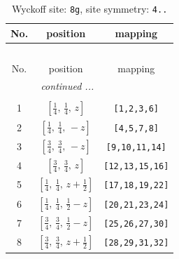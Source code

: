 \documentclass[fleqn,8pt]{jsarticle}
\begin{document}
\begin{longtable}{ccc}
\caption{Wyckoff site: {\tt 8g}, site symmetry: {\tt 4..}}
 \\
 \hline \hline
No. & position & mapping \\ \hline \endfirsthead

\multicolumn{2}{l}{\tablename\ \thetable{}} \\
 \hline \hline
No. & position & mapping \\ \hline \endhead

 \hline \hline
\multicolumn{2}{r}{\footnotesize\it continued ...} \\ \endfoot

 \hline \hline
\multicolumn{2}{r}{} \\ \endlastfoot

1 & $\left[ \frac{1}{4},\, \frac{1}{4},\, z \right]$ & {\tt [1,2,3,6]} \\ \hline
2 & $\left[ \frac{1}{4},\, \frac{1}{4},\, - z \right]$ & {\tt [4,5,7,8]} \\ \hline
3 & $\left[ \frac{3}{4},\, \frac{3}{4},\, - z \right]$ & {\tt [9,10,11,14]} \\ \hline
4 & $\left[ \frac{3}{4},\, \frac{3}{4},\, z \right]$ & {\tt [12,13,15,16]} \\ \hline
5 & $\left[ \frac{1}{4},\, \frac{1}{4},\, z + \frac{1}{2} \right]$ & {\tt [17,18,19,22]} \\ \hline
6 & $\left[ \frac{1}{4},\, \frac{1}{4},\, \frac{1}{2} - z \right]$ & {\tt [20,21,23,24]} \\ \hline
7 & $\left[ \frac{3}{4},\, \frac{3}{4},\, \frac{1}{2} - z \right]$ & {\tt [25,26,27,30]} \\ \hline
8 & $\left[ \frac{3}{4},\, \frac{3}{4},\, z + \frac{1}{2} \right]$ & {\tt [28,29,31,32]} \\
\end{longtable}
\renewcommand{\arraystretch}{1.2}
\end{document}
